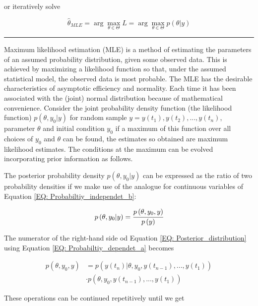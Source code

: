 \documentclass[a4paper,fleqn]{cas-dc}
\begin{document}
or iteratively solve 

{\footnotesize
	\begin{equation}
		\hat{\theta}_{MLE} = \arg \max_{\theta \in \Theta} L = \arg \max_{\theta \in \Theta} p(\theta|y)
	\end{equation}
}

\hrule

Maximum likelihood estimation (MLE) is a method of estimating the parameters of an assumed probability distribution, given some observed data. This is achieved by maximizing a likelihood function so that, under the assumed statistical model, the observed data is most probable. The MLE has the desirable characteristics of asymptotic efficiency and normality. Each time it has been associated with the (joint) normal distribution because of mathematical convenience. Consider the joint probability density function (the likelihood function) $p(\theta, y_0|y)$ for random sample $y = y(t_1),y(t_2),...,y(t_n)$, parameter $\theta$ and initial condition $y_0$ if a maximum of this function over all choices of $y_0$ and $\theta$ can be found, the estimates so obtained are maximum likelihood estimates. The conditions at the maximum can be evolved incorporating prior information as follows.

The posterior probability density $p(\theta,y_0|y)$ can be expressed as the ratio of two probability densities if we make use of the analogue for continuous variables of Equation \ref{EQ: Probabiltiy_independet_b}:

{\footnotesize
\begin{align} \label{EQ: Posterior_distribution}
	p\left( \theta,y_0|y \right) = \cfrac{p\left( \theta, y_0, y \right)}{p\left( y \right)}
\end{align} }

The numerator of the right-hand side od Equation \ref{EQ: Posterior_distribution} using Equation \ref{EQ: Probabiltiy_dependet_a} becomes 

{\footnotesize
\begin{equation}
	\begin{split}
		p\left( \theta,y_0,y \right) &= p\left( y(t_n)|\theta,y_0,y(t_{n-1}),...,y(t_1) \right) \\ &\cdot p\left( \theta,y_0,y(t_{n-1}),...,y(t_1) \right)
	\end{split}
\end{equation} }

These operations can be continued repetitively until we get
\end{document}
